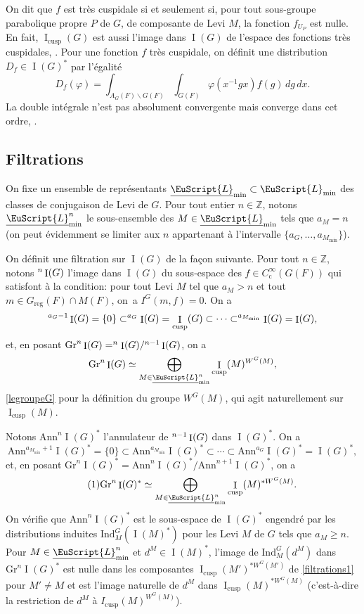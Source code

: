 \documentclass[JEP,XML,SOM,Unicode,francais]{cedram}
\let\mathcal \EuScript
\newcommand{\NoChangel}[1]{%
\expandafter\let\csname old\string#1\endcsname=#1
\let#1=\relax
\newcommand{#1}{\mathcode`l="716C\csname old\string#1\endcsname\mathcode`l="7160 }%
}
\newcommand{\Ann}{\mathrm{Ann}}
\newcommand{\rc}{\mathrm{c}}
\newcommand{\cusp}{\mathrm{cusp}}
\newcommand{\Fil}{\mathrm{Fil}} \NoChangel{\Fil}
\newcommand{\Gr}{\mathrm{Gr}}
\newcommand{\Ind}{\mathrm{Ind}}
\newcommand{\reg}{\mathrm{reg}}
\DeclareMathOperator{\rI}{I}
\newcommand{\cL}{\mathcal{L}}
\newcommand{\ZZ}{\mathbb{Z}}
\theoremstyle{plain}
\theoremstyle{definition}
\begin{document}
On dit que $f$ est très cuspidale si et seulement si, pour tout sous-groupe parabolique propre $P$ de $G$, de composante de Levi $M$, la fonction $f_{U_{P}}$ est nulle. En fait, $\rI_{\cusp}(G)$ est aussi l'image dans $\rI(G)$ de l'espace des fonctions très cuspidales, \cf \cite[Lem.\,2.7]{W3}. Pour une fonction $f$ très cuspidale, on définit une distribution $D_{f}\in \rI(G)^*$ par l'égalité
\[
D_{f}(\varphi)=\int_{A_{G}(F)\backslash G(F)}\int_{G(F)}\varphi(x^{-1}gx)f(g)\,dg\,dx.
\]
La double intégrale n'est pas absolument convergente mais converge dans cet ordre, \cf \cite[Lem.\,9]{W2}.

\subsection{Filtrations}\label{filtrations}

On fixe un ensemble de représentants $\underline{\cL}_{\min}\subset \cL_{\min}$ des classes de conjugaison de Levi de $G$. Pour tout entier $n\in \ZZ$, notons $\underline{\cL}_{\min}^n$ le sous-ensemble des $M\in \underline{\cL}_{\min}$ tels que $ a_{M}=n$ (on peut évidemment se limiter aux $n$ appartenant à l'intervalle $\{a_{G},\dots,a_{M_{\min}}\}$).

On définit une filtration sur $\rI(G)$ de la façon suivante. Pour tout $n \in \ZZ$, notons $\Fil^n\rI(G)$ l'image dans $\rI(G)$ du sous-espace des $f\in C_{\rc}^{\infty}(G(F))$ qui satisfont à la condition: pour tout Levi $M$ tel que $a_{M}>n$ et tout $m\in G_{\reg}(F)\cap M(F)$, on~a $I^G(m,f)=0$. On a
\[
\Fil^{a_{G}-1}\rI(G)=\{0\}\subset \Fil^{a_{G}}\rI(G)=\rI_{\cusp}(G)\subset\cdots\subset \Fil^{a_{M_{\min}}}\rI(G)=\rI(G),
\]
et, en posant $\Gr^n\rI(G)=\Fil^n\rI(G)/\Fil^{n-1}\rI(G)$, on a
\[
\Gr^n\rI(G)\simeq \bigoplus_{M\in \underline{\cL}_{\min}^n}\rI_{\cusp}(M)^{ W^G(M)},
\]
\cf \ref{legroupeG} pour la définition du groupe $W^G(M)$, qui agit naturellement sur $\rI_{\cusp}(M)$.

Notons $\Ann^n\rI(G)^*$ l'annulateur de $\Fil^{n-1}\rI(G)$ dans $\rI(G)^*$. On a
\[
\Ann^{a_{M_{\min}}+1}\rI(G)^*=\{0\}\subset \Ann^{a_{M_{\min}}}\rI(G)^*\subset\cdots\subset \Ann^{a_{G}}\rI(G)^*=\rI(G)^*,
\]
et, en posant $\Gr^n\rI(G)^*=\Ann^n\rI(G)^*/\Ann^{n+1}\rI(G)^*$, on a
\begin{equation}\tag{1}\label{filtrations1}
\Gr^n\rI(G)^*\simeq \bigoplus_{M\in \underline{\cL}_{\min}^n}\rI_{\cusp}(M)^{* W^G(M)}.
\end{equation}
On vérifie que $\Ann^n\rI(G)^*$ est le sous-espace de $\rI(G)^*$ engendré par les distributions induites $\Ind_{M}^G(\rI(M)^*)$ pour les Levi $M$ de $G$ tels que $a_{M}\geq n$. Pour $M\in \underline{\cL}_{\min}^n$ et $d^M\in \rI(M)^*$, l'image de $\Ind_{M}^G(d^M)$ dans $\Gr^n\rI(G)^*$ est nulle dans les composantes $\rI_{\cusp}(M')^{* W^G(M')}$ de \eqref{filtrations1} pour $M'\neq M$ et est l'image naturelle de $d^M$ dans $\rI_{\cusp}(M)^{* W^G(M)}$ (c'est-à-dire la restriction de $d^{M}$ à $I_{\cusp}(M)^{ W^G(M)}$).
\end{document}
